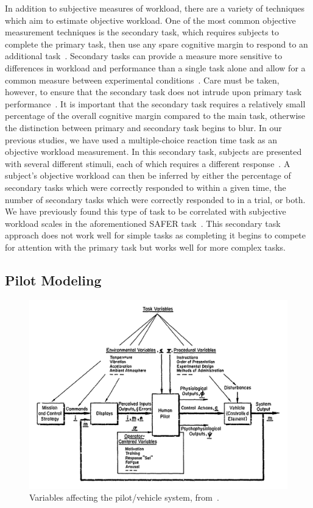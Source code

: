 In addition to subjective measures of workload, there are a variety of techniques which aim to estimate objective workload.
One of the most common objective measurement techniques is the secondary task, which requires subjects to complete the primary task, then use any spare cognitive margin to respond to an additional task~\citep{gawron_human_2008}.
Secondary tasks can provide a measure more sensitive to differences in workload and performance than a single task alone and allow for a common measure between experimental conditions~\citep{slocum1971meaningful}.
Care must be taken, however, to ensure that the secondary task does not intrude upon primary task performance~\citep{williges_behavioral_1979}.
It is important that the secondary task requires a relatively small percentage of the overall cognitive margin compared to the main task, otherwise the distinction between primary and secondary task begins to blur.
In our previous studies, we have used a multiple-choice reaction time task as an objective workload measurement.
In this secondary task, subjects are presented with several different stimuli, each of which requires a different response~\citep{lysaght_operator_1989}.
A subject's objective workload can then be inferred by either the percentage of secondary tasks which were correctly responded to within a given time, the number of secondary tasks which were correctly responded to in a trial, or both.
We have previously found this type of task to be correlated with subjective workload scales in the aforementioned SAFER task~\citep{karasinski_real-time_2017}.
This secondary task approach does not work well for simple tasks as completing it begins to compete for attention with the primary task but works well for more complex tasks.

\subsection{Pilot Modeling}
\label{background:pilotmodeling}

\begin{figure}[!b]
    \begin{center}
        \includegraphics[width=0.8\linewidth]{figures/Introduction/Screen_Shot_2018-07-25_at_10_37_08_AM.png}
        \caption[Variables affecting the pilot/vehicle system]{Variables affecting the pilot/vehicle system, from~\citet{mcruer_mathematical_1974}.}
        \label{figure:mcruer1974}
    \end{center}
\end{figure}

